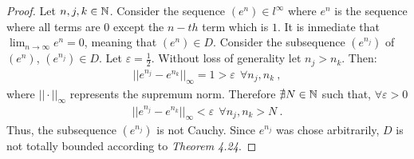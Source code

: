 \begin{questions}


\begin{solution}
  \begin{proof}
  Let $n,j,k\in\mathbb{N}$. Consider the sequence $(e^n)\in l^\infty$ where $e^n$ is the sequence where all terms are $0$ except the $n-th$ term which is $1$. It is inmediate that $\lim_{n\rightarrow\infty} e^n=0$, meaning that $(e^n)\in D$. Consider the subsequence $(e^{n_j})$ of $(e^n)$, $(e^{n_j})\in D$. Let $\varepsilon=\frac{1}{2}$. Without loss of generality let $n_j>n_k$. Then:
  \begin{align*}
  ||e^{n_j}-e^{n_k}||_{\infty}=1>\varepsilon~~\forall n_j,n_k~,
  \end{align*}
  where $||\cdot ||_{\infty}$ represents the supremum norm. Therefore $\nexists N\in\mathbb{N}$ such that, $\forall\varepsilon>0$
  \begin{align*}
    ||e^{n_j}-e^{n_k}||_{\infty}<\varepsilon~~\forall n_j,n_k>N~.
  \end{align*}
  Thus, the subsequence $(e^{n_j})$ is not Cauchy. Since $e^{n_j}$ was chose arbitrarily, $D$ is not totally bounded according to \textit{Theorem 4.24}.
  \end{proof}
\end{solution}
\end{questions}